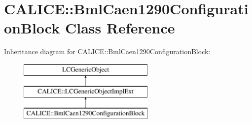 \section{C\-A\-L\-I\-C\-E\-:\-:Bml\-Caen1290\-Configuration\-Block Class Reference}
\label{classCALICE_1_1BmlCaen1290ConfigurationBlock}
Inheritance diagram for C\-A\-L\-I\-C\-E\-:\-:Bml\-Caen1290\-Configuration\-Block\-:\begin{figure}[H]
\begin{center}
\leavevmode
\includegraphics[height=3.000000cm]{classCALICE_1_1BmlCaen1290ConfigurationBlock}
\end{center}
\end{figure}
